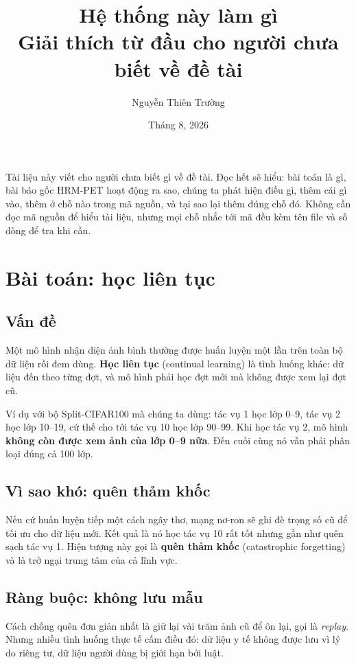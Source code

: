 \documentclass[11pt,a4paper]{article}
\title{\bfseries Hệ thống này làm gì\\[2pt]
\large\mdseries Giải thích từ đầu cho người chưa biết về đề tài}
\author{Nguyễn Thiên Trường}
\date{Tháng 8, 2026}
\begin{document}
\maketitle

\noindent
Tài liệu này viết cho người chưa biết gì về đề tài. Đọc hết sẽ hiểu: bài toán là
gì, bài báo gốc HRM-PET hoạt động ra sao, chúng ta phát hiện điều gì, thêm cái gì
vào, thêm ở chỗ nào trong mã nguồn, và tại sao lại thêm đúng chỗ đó. Không cần
đọc mã nguồn để hiểu tài liệu, nhưng mọi chỗ nhắc tới mã đều kèm tên file và số
dòng để tra khi cần.

\tableofcontents
\bigskip

\section{Bài toán: học liên tục}

\subsection{Vấn đề}

Một mô hình nhận diện ảnh bình thường được huấn luyện một lần trên toàn bộ dữ
liệu rồi đem dùng. \textbf{Học liên tục} (continual learning) là tình huống khác:
dữ liệu đến theo từng đợt, và mô hình phải học đợt mới mà không được xem lại đợt
cũ.

Ví dụ với bộ Split-CIFAR100 mà chúng ta dùng: tác vụ 1 học lớp 0--9, tác vụ 2 học
lớp 10--19, cứ thế cho tới tác vụ 10 học lớp 90--99. Khi học tác vụ 2, mô hình
\textbf{không còn được xem ảnh của lớp 0--9 nữa}. Đến cuối cùng nó vẫn phải phân
loại đúng cả 100 lớp.

\subsection{Vì sao khó: quên thảm khốc}

Nếu cứ huấn luyện tiếp một cách ngây thơ, mạng nơ-ron sẽ ghi đè trọng số cũ để
tối ưu cho dữ liệu mới. Kết quả là nó học tác vụ 10 rất tốt nhưng gần như quên
sạch tác vụ 1. Hiện tượng này gọi là \textbf{quên thảm khốc} (catastrophic
forgetting) và là trở ngại trung tâm của cả lĩnh vực.

\subsection{Ràng buộc: không lưu mẫu}

Cách chống quên đơn giản nhất là giữ lại vài trăm ảnh cũ để ôn lại, gọi là
\emph{replay}. Nhưng nhiều tình huống thực tế cấm điều đó: dữ liệu y tế không
được lưu vì lý do riêng tư, dữ liệu người dùng bị giới hạn bởi luật.
\end{document}
